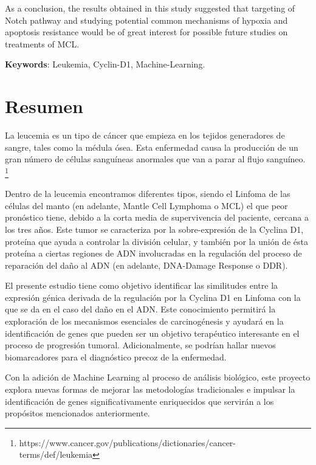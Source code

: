 As a conclusion, the results obtained in this study suggested that targeting of Notch pathway and studying potential common mechanisms of hypoxia and apoptosis resistance would be of great interest for possible future studies on treatments of MCL.

\vspace{1.5cm}

\textbf{Keywords}: Leukemia, Cyclin-D1, Machine-Learning.

\newpage
\chapter*{Resumen}

\onehalfspacing

La leucemia es un tipo de cáncer que empieza en los tejidos generadores de sangre, tales como la médula ósea. Esta enfermedad causa la producción de un gran número de células sanguíneas anormales que van a parar al flujo sanguíneo.
\footnote{https://www.cancer.gov/publications/dictionaries/cancer-terms/def/leukemia}

Dentro de la leucemia encontramos diferentes tipos, siendo el Linfoma de las células del manto (en adelante, Mantle Cell Lymphoma o MCL) el que peor pronóstico tiene, debido a la corta media de supervivencia del paciente, cercana a los tres años.
Este tumor se caracteriza por la sobre-expresión de la Cyclina D1, proteína que ayuda a controlar la división celular, y también por la unión de ésta proteína a ciertas regiones de ADN involucradas en la regulación del proceso de reparación del daño al ADN (en adelante, DNA-Damage Response o DDR).


El presente estudio tiene como objetivo identificar las similitudes entre la expresión génica derivada de la regulación por la Cyclina D1 en Linfoma con la que se da en el caso del daño en el ADN. Este conocimiento permitirá la exploración de los mecanismos esenciales de carcinogénesis y ayudará en la identificación de genes que pueden ser un objetivo terapéutico interesante en el proceso de progresión tumoral. Adicionalmente, se podrían hallar nuevos biomarcadores para el diagnóstico precoz de la enfermedad.

Con la adición de Machine Learning al proceso de análisis biológico, este proyecto explora nuevas formas de mejorar las metodologías tradicionales e impulsar la identificación de genes significativamente enriquecidos que servirán a los propósitos mencionados anteriormente.

